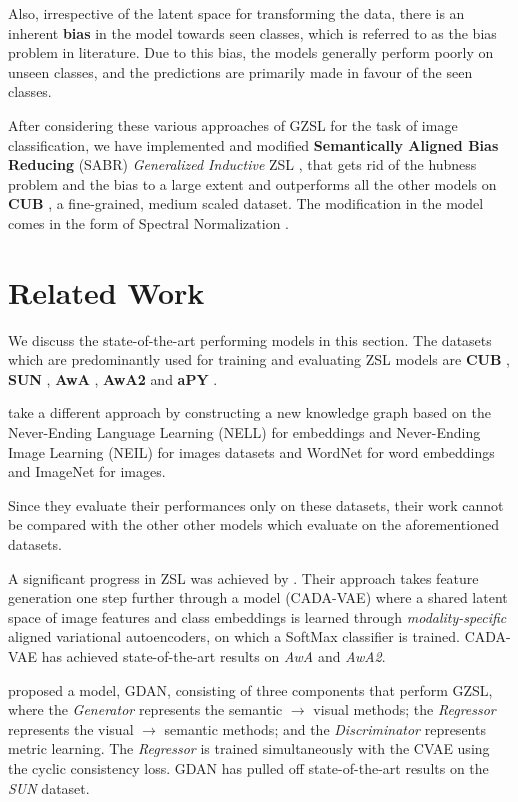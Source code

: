 \documentclass{article}
\begin{document}
Also, irrespective of the latent space for transforming the data, there is an inherent \textbf{bias} in the model towards seen classes, 
which is referred to as the bias problem in literature. 
Due to this bias, the models generally perform poorly on unseen classes, and the predictions are primarily made in favour of the seen classes.

After considering these various approaches of GZSL for the task of image classification, 
we have implemented and modified \textbf{Semantically Aligned Bias Reducing} (SABR) \textit{Generalized Inductive} ZSL \citep{akanksha}, 
that gets rid of the hubness problem and the bias to a large extent and outperforms all the other models on \textbf{CUB} \citep{cub}, a fine-grained, medium scaled dataset.
The modification in the model comes in the form of Spectral Normalization \citep{spectralnorm}. 


\section{Related Work}
\label{related work}
We discuss the state-of-the-art performing models in this section. 
The datasets which are predominantly used for training and evaluating ZSL models are \textbf{CUB} \citep{cub}, \textbf{SUN} \citep{sun}, \textbf{AwA} \citep{awa}, \textbf{AwA2} \citep{awa2}  and \textbf{aPY} \citep{apy}.

\citet{abhinav} take a different approach by constructing a new knowledge graph based on the Never-Ending Language Learning (NELL) for embeddings \citep{gcn3} and Never-Ending Image Learning (NEIL) for images \citep{gcn8} datasets and WordNet for word embeddings and ImageNet for images.

Since they evaluate their performances only on these datasets, their work cannot be compared with the other other models which evaluate on the aforementioned datasets.

A significant progress in ZSL was achieved by \citep{edgar}. 
Their approach takes feature generation one step further through a model (CADA-VAE)
where a shared latent space of image features and class embeddings is learned through \textit{modality-specific} aligned variational autoencoders, 
on which a SoftMax classifier is trained. CADA-VAE has achieved state-of-the-art results on \textit{AwA} and \textit{AwA2}.

\citet{changhu} proposed a model, GDAN, consisting of three components that perform GZSL, where 
the \textit{Generator} represents the semantic $\rightarrow$ visual methods; 
the \textit{Regressor} represents the visual $\rightarrow$ semantic methods; and 
the \textit{Discriminator} represents metric learning. The \textit{Regressor} is trained simultaneously with the CVAE using the cyclic consistency loss.
GDAN has pulled off state-of-the-art results on the \textit{SUN} dataset. 
\end{document}
